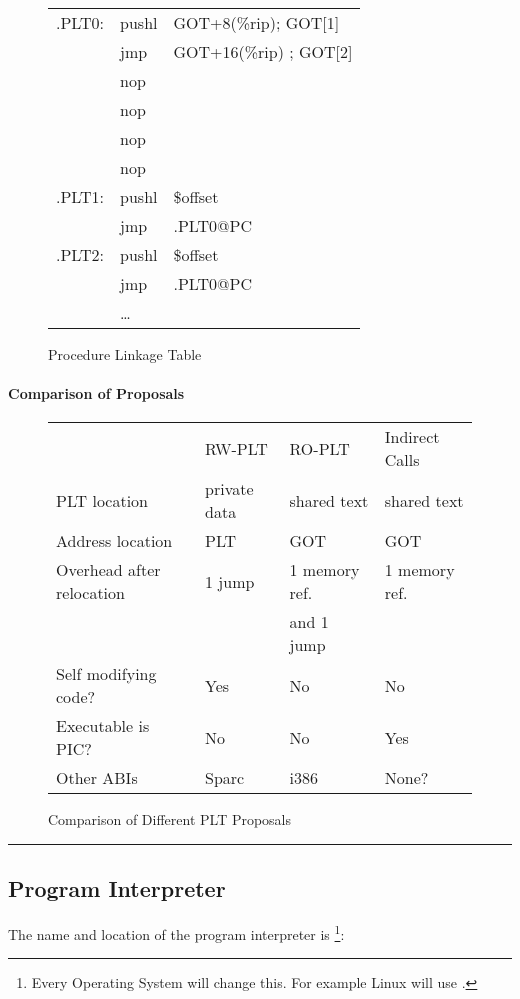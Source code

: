 \begin{figure}[H]
\caption{Procedure Linkage Table}
\begin{tabular}{lll}
.PLT0: & pushl & GOT+8(\%rip); GOT[1]\\
& jmp &GOT+16(\%rip) ; GOT[2] \\
& nop & \\
& nop & \\
& nop & \\
& nop & \\
.PLT1: & pushl & \$offset \\
&jmp &.PLT0@PC \\
.PLT2: &pushl & \$offset \\
& jmp & .PLT0@PC \\
&\dots\\
\end{tabular}
\end{figure}



\paragraph{Comparison of Proposals}

\begin{figure}
\caption{Comparison of Different PLT Proposals}

\begin{center}
\begin{tabular}{llll}
    \hline\noalign{\smallskip}
&RW-PLT & RO-PLT & Indirect Calls \\
    \noalign{\smallskip}\hline\noalign{\smallskip}
PLT location & private data & shared text & shared text \\
Address location & PLT & GOT & GOT \\
Overhead after relocation & 1 jump & 1 memory ref. & 1 memory ref.\\
&&and 1 jump &  \\
Self modifying code? & Yes &  No & No\\
Executable is PIC? & No & No & Yes \\
Other ABIs & Sparc & i386 & None? \\
\end{tabular}
\end{center}
\end{figure}
                                

\bigskip\hrule

\subsection{Program Interpreter}

The name and location of the program interpreter  is%
\footnote{Every Operating System will change this.
  For example Linux will use .}:

\bigskip
{}

